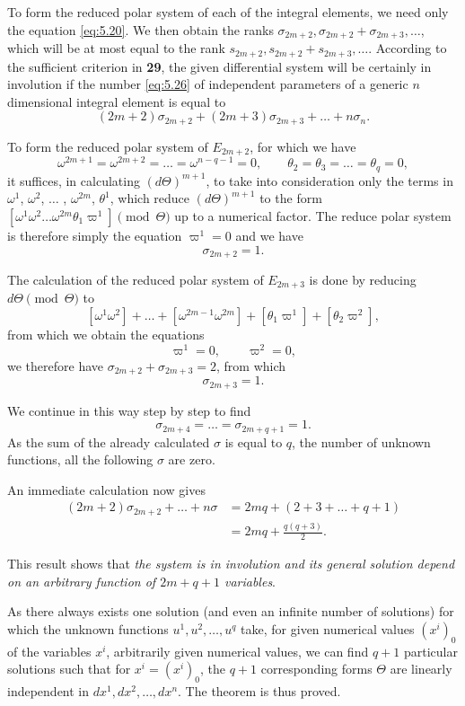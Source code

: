 \documentclass[leqno,11pt]{book}
\numberwithin{equation}{chapter}
\theoremstyle{shape1}
\theoremstyle{shape0}
\theoremstyle{shape2}
\theoremstyle{definition}
\begin{document}
To form the reduced polar system of each of the integral elements, we need only the equation \eqref{eq:5.20}. We then obtain the ranks $\sigma_{2m+2},\sigma_{2m+2}+\sigma_{2m+3},\dots$, which will be at most equal to the rank $s_{2m+2},s_{2m+2}+s_{2m+3},\dots$. According to the sufficient criterion in \textsection\textbf{29}, the given differential system will be certainly in involution if the number \eqref{eq:5.26} of independent parameters of a generic $n$ dimensional integral element is equal to
\[
(2m+2)\sigma_{2m+2}+(2m+3)\sigma_{2m+3}+\dots+n\sigma_{n}.
\]



\vspace{12pt}\fsec To form the reduced polar system of $E_{2m+2}$, for which we have
\[
\omega^{2m+1}=\omega^{2m+2}=\dots=\omega^{n-q-1}=0,\qquad\theta_{2}=\theta_{3}=\dots=\theta_{q}=0,
\]
it suffices, in calculating $(d\Theta)^{m+1}$, to take into consideration only the terms in $\omega^{1}$, $\omega^{2}$, $\dots$ , $\omega^{2m}$, $\theta^{1}$, which reduce $(d\Theta)^{m+1}$ to the form $[\omega^{1}\omega^{2}\dots\omega^{2m}\theta_{1}\varpi^{1}]\pmod{\Theta}$ up to a numerical factor. The reduce polar system is therefore simply the equation $\varpi^{1}=0$ and we have
\[
\sigma_{2m+2}=1.
\]

The calculation of the reduced polar system of $E_{2m+3}$ is done by reducing $d\Theta\pmod{\Theta}$ to
\[
[\omega^{1}\omega^{2}]+\dots+[\omega^{2m-1}\omega^{2m}]+[\theta_{1}\varpi^{1}]+[\theta_{2}\varpi^{2}],
\]
from which we obtain the equations
\[
\varpi^{1}=0,\qquad\varpi^{2}=0,
\]
we therefore have $\sigma_{2m+2}+\sigma_{2m+3}=2$, from which
\[
\sigma_{2m+3}=1.
\]

We continue in this way step by step to find
\[
\sigma_{2m+4}=\dots=\sigma_{2m+q+1}=1.
\]
As the sum of the already calculated $\sigma$ is equal to $q$, the number of unknown functions, all the following $\sigma$ are zero.

An immediate calculation now gives
\begin{align*}
  (2m+2)\sigma_{2m+2}+\dots+n\sigma&=2mq+(2+3+\dots+q+1)\\
  &=2mq+\frac{q(q+3)}{2}.
\end{align*}

This result shows that \emph{the system is in involution and its general solution depend on an arbitrary function of $2m+q+1$ variables}.

As there always exists one solution (and even an infinite number of solutions) for which the unknown functions $u^{1},u^{2},\dots,u^{q}$ take, for given numerical values $(x^{i})_{0}$ of the variables $x^{i}$, arbitrarily given numerical values, we can find $q+1$ particular solutions such that for $x^{i}=(x^{i})_{0}$, the $q+1$ corresponding forms $\Theta$ are linearly independent in $dx^{1},dx^{2},\dots,dx^{n}$. The theorem is thus proved.
\end{document}

